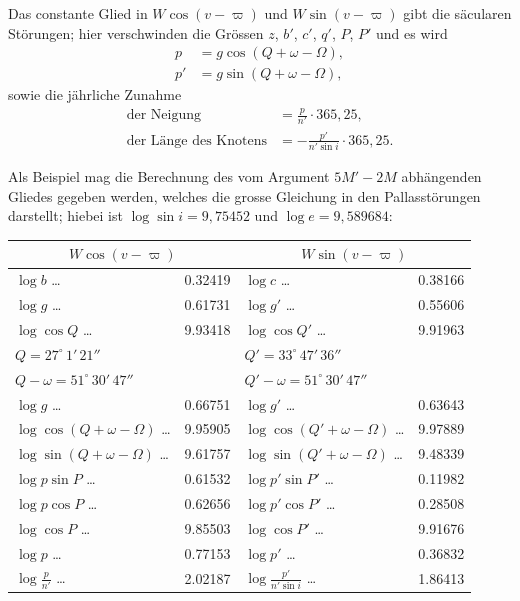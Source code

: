 \documentclass[12pt,a4paper]{article}
\begin{document}
Das constante Glied in $W \cos(v-\varpi)$ und $W \sin(v-\varpi)$ gibt die säcularen Störungen; hier verschwinden die Grössen $z$, $b'$, $c'$, $q'$, $P$, $P'$ und es wird
\begin{align*}
p &= g \cos(Q + \omega - \Omega),\\
p' &= g \sin(Q + \omega - \Omega),
\end{align*}
sowie die jährliche Zunahme
\begin{align*}
\text{der Neigung} &= \frac{p}{n'} \cdot 365{,}25,\\
\text{der Länge des Knotens} &= -\frac{p'}{n' \sin i} \cdot 365{,}25.
\end{align*}

Als Beispiel mag die Berechnung des vom Argument $5M' - 2M$ abhängenden Gliedes gegeben werden, welches die grosse Gleichung in den Pallasstörungen darstellt; hiebei ist $\log \sin i = 9{,}75452$ und $\log e = 9{,}589684$:

\begin{center}
\begin{tabular}{@{}l@{\quad}l@{\quad}|@{\quad}l@{\quad}l@{}}
\multicolumn{2}{c|}{$W \cos(v-\varpi)$} & \multicolumn{2}{c}{$W \sin(v-\varpi)$}\\
\midrule
$\log b$ \ldots{} & 0.32419 & $\log c$ \ldots{} & 0.38166\\
$\log g$ \ldots{} & 0.61731 & $\log g'$ \ldots{} & 0.55606\\
$\log \cos Q$ \ldots{} & 9.93418 & $\log \cos Q'$ \ldots{} & 9.91963\\
$Q = 27^{\circ}\, 1'\, 21''$ & & $Q' = 33^{\circ}\, 47'\, 36''$ & \\
$Q - \omega = 51^{\circ}\, 30'\, 47''$ & & $Q' - \omega = 51^{\circ}\, 30'\, 47''$ & \\
$\log g$ \ldots{} & 0.66751 & $\log g'$ \ldots{} & 0.63643\\
$\log \cos(Q+\omega-\Omega)$ \ldots{} & 9.95905 & $\log \cos(Q'+\omega-\Omega)$ \ldots{} & 9.97889\\
$\log \sin(Q+\omega-\Omega)$ \ldots{} & 9.61757 & $\log \sin(Q'+\omega-\Omega)$ \ldots{} & 9.48339\\
$\log p \sin P$ \ldots{} & 0.61532 & $\log p' \sin P'$ \ldots{} & 0.11982\\
$\log p \cos P$ \ldots{} & 0.62656 & $\log p' \cos P'$ \ldots{} & 0.28508\\
$\log \cos P$ \ldots{} & 9.85503 & $\log \cos P'$ \ldots{} & 9.91676\\
$\log p$ \ldots{} & 0.77153 & $\log p'$ \ldots{} & 0.36832\\
$\log \frac{p}{n'}$ \ldots{} & 2.02187 & $\log \frac{p'}{n' \sin i}$ \ldots{} & 1.86413
\end{tabular}
\end{center}
\end{document}
